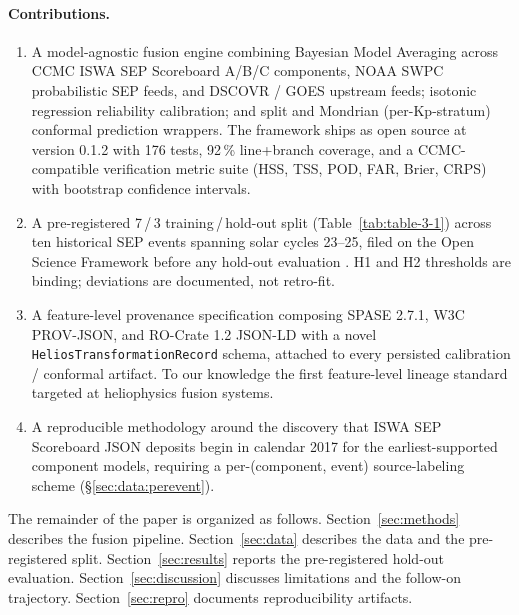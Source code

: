 \documentclass[11pt,letterpaper]{article}
\begin{document}
\paragraph{Contributions.}
\begin{enumerate}[leftmargin=*,itemsep=0pt]
  \item A model-agnostic fusion engine combining Bayesian Model Averaging
        across CCMC ISWA SEP Scoreboard A/B/C components, NOAA SWPC
        probabilistic SEP feeds, and DSCOVR / GOES upstream feeds; isotonic
        regression reliability calibration; and split and Mondrian
        (per-Kp-stratum) conformal prediction wrappers.  The framework
        ships as open source \cite{helios_fusion_engine} at version 0.1.2
        with 176 tests, 92\,\% line+branch coverage, and a CCMC-compatible
        verification metric suite (HSS, TSS, POD, FAR, Brier, CRPS) with
        bootstrap confidence intervals.
  \item A pre-registered 7\,/\,3 training\,/\,hold-out split (Table~\ref{tab:table-3-1})
        across ten historical SEP events spanning solar cycles 23--25,
        filed on the Open Science Framework before any hold-out
        evaluation \cite{osf_prereg}.  H1 and H2 thresholds are binding;
        deviations are documented, not retro-fit.
  \item A feature-level provenance specification \cite{helios_provenance_spec}
        composing SPASE 2.7.1, W3C PROV-JSON, and RO-Crate 1.2 JSON-LD with
        a novel \texttt{HeliosTransformationRecord} schema, attached to
        every persisted calibration / conformal artifact.  To our knowledge
        the first feature-level lineage standard targeted at heliophysics
        fusion systems.
  \item A reproducible methodology around the discovery that ISWA SEP
        Scoreboard JSON deposits begin in calendar 2017 for the
        earliest-supported component models, requiring a
        per-(component, event) source-labeling scheme
        (§\ref{sec:data:perevent}).
\end{enumerate}

The remainder of the paper is organized as follows.
Section~\ref{sec:methods} describes the fusion pipeline.
Section~\ref{sec:data} describes the data and the pre-registered split.
Section~\ref{sec:results} reports the pre-registered hold-out evaluation.
Section~\ref{sec:discussion} discusses limitations and the follow-on
trajectory.  Section~\ref{sec:repro} documents reproducibility artifacts.
\end{document}
